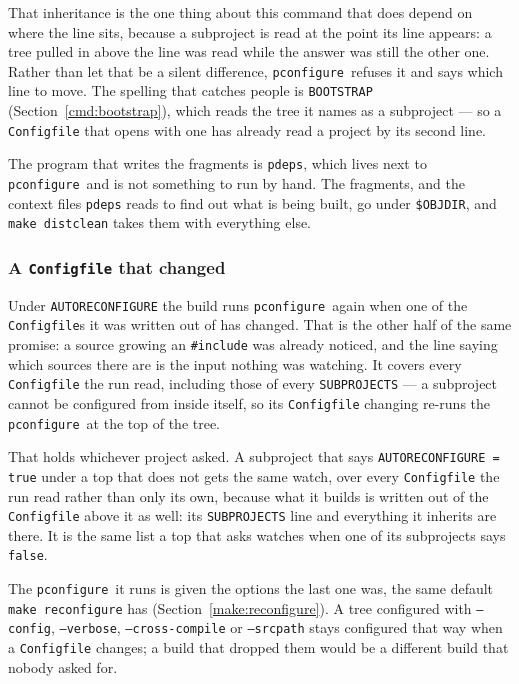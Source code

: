 \documentclass{article}
\newcommand{\pconfigure}{\texttt{pconfigure}}
\begin{document}
That inheritance is the one thing about this command that does depend
on where the line sits, because a subproject is read at the point its
line appears: a tree pulled in above the line was read while the
answer was still the other one.  Rather than let that be a silent
difference, \pconfigure\ refuses it and says which line to move.  The
spelling that catches people is \texttt{BOOTSTRAP}
(Section~\ref{cmd:bootstrap}), which reads the tree it names as a
subproject --- so a \texttt{Configfile} that opens with one has
already read a project by its second line.

The program that writes the fragments is \texttt{pdeps}, which lives
next to \pconfigure\ and is not something to run by hand.  The
fragments, and the context files \texttt{pdeps} reads to find out what
is being built, go under \texttt{\$OBJDIR}, and \texttt{make
distclean} takes them with everything else.

\subsubsection{A \texttt{Configfile} that changed}

Under \texttt{AUTORECONFIGURE} the build runs \pconfigure\ again when
one of the \texttt{Configfile}s it was written out of has changed.
That is the other half of the same promise: a source growing an
\texttt{\#include} was already noticed, and the line saying which
sources there are is the input nothing was watching.  It covers every
\texttt{Configfile} the run read, including those of every
\texttt{SUBPROJECTS} --- a subproject cannot be configured from inside
itself, so its \texttt{Configfile} changing re-runs the \pconfigure\
at the top of the tree.

That holds whichever project asked.  A subproject that says
\texttt{AUTORECONFIGURE = true} under a top that does not gets the same
watch, over every \texttt{Configfile} the run read rather than only its
own, because what it builds is written out of the \texttt{Configfile}
above it as well: its \texttt{SUBPROJECTS} line and everything it
inherits are there.  It is the same list a top that asks watches when
one of its subprojects says \texttt{false}.

The \pconfigure\ it runs is given the options the last one was, the
same default \texttt{make reconfigure} has
(Section~\ref{make:reconfigure}).  A tree configured with
\texttt{--config}, \texttt{--verbose}, \texttt{--cross-compile} or
\texttt{--srcpath} stays configured that way when a
\texttt{Configfile} changes; a build that dropped them would be a
different build that nobody asked for.
\end{document}
